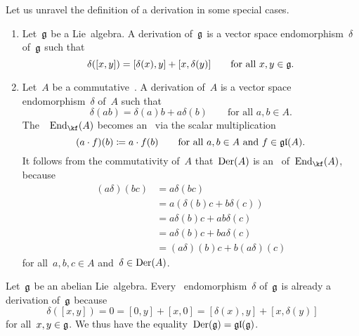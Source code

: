 \begin{remark}
	\label{derivations made explicit}
	Let us unravel the definition of a derivation in some special cases.
	\begin{enumerate}
		\item
			Let~$\mathfrak{g}$ be a Lie~algebra.
			A derivation of~$\mathfrak{g}$ is a vector space endomorphism~$\delta$ of~$\mathfrak{g}$ such that
			\[
				\delta([x,y])
				=
				[\delta(x), y] + [x, \delta(y)]
				\qquad
				\text{for all~$x, y \in \mathfrak{g}$.}
			\]
		\item
			Let~$A$ be a commutative~\algebra{$\kf$}.
			A derivation of~$A$ is a vector space endomorphism~$\delta$ of~$A$ such that
			\[
				\delta(ab)
				=
				\delta(a) b + a \delta(b)
				\qquad
				\text{for all~$a, b \in A$}.
			\]
			The~\vectorspace{$\kf$}~$\End_{\kf}(A)$ becomes an~ via the scalar multiplication
			\[
				(a \cdot f)(b)
				\coloneqq
				a \cdot f(b)
				\qquad
				\text{for all~$a, b \in A$ and~$f \in \mathfrak{gl}(A)$.}
			\]
			It follows from the commutativity of~$A$ that~$\operatorname{Der}(A)$ is an~ of~$\End_{\kf}(A)$, because
			\begin{align*}
				(a \delta)(b c)
				&=
				a \delta(b c)
				\\
				&=
				a ( \delta(b) c + b \delta(c) )
				\\
				&=
				a \delta(b) c + a b \delta(c)
				\\
				&=
				a \delta(b) c + b a \delta(c)
				\\
				&=
				(a \delta)(b) c + b (a \delta)(c)
			\end{align*}
			for all~$a, b, c \in A$ and~$\delta \in \operatorname{Der}(A)$.
	\end{enumerate}
\end{remark}


\begin{example}
	Let~$\mathfrak{g}$ be an abelian Lie~algebra.
	Every~\linear{$\kf$} endomorphism~$\delta$ of~$\mathfrak{g}$ is already a derivation of~$\mathfrak{g}$ because
	\[
		\delta([x,y])
		=
		0
		=
		[0, y] + [x, 0]
		=
		[\delta(x), y] + [x, \delta(y)]
	\]
	for all~$x, y \in \mathfrak{g}$.
	We thus have the equality~$\operatorname{Der}(\mathfrak{g}) = \mathfrak{gl}(\mathfrak{g})$.
\end{example}


